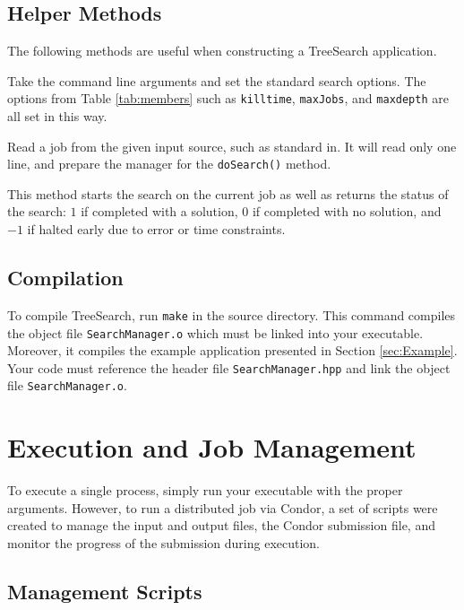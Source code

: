 \documentclass[11pt]{article}
\def\TreeSearch{{TreeSearch}}
\begin{document}
	
\subsection{Helper Methods}

The following methods are useful when constructing a {\TreeSearch} application.

	Take the command line arguments and set the standard search options.
	The options from Table \ref{tab:members} such as \texttt{killtime},
		\texttt{maxJobs}, and \texttt{maxdepth} are all set
		in this way.

	Read a job from the given input source, such as standard in.
	It will read only one line,
		and prepare the manager for the \texttt{doSearch()} method.
	
	This method starts the search on the current job
		as well as returns the status of the search:
		$1$ if completed with a solution,
		$0$ if completed with no solution,
		and $-1$ if halted early due to error or time constraints.
	

\subsection{Compilation}
\label{sec:Compilation}

To compile \TreeSearch, run \texttt{make} in the source directory.
This command compiles the object file \texttt{SearchManager.o} which must be
	linked into your executable.
Moreover, it compiles the example application presented in Section \ref{sec:Example}.
Your code must reference the header file \texttt{SearchManager.hpp}
	and link the object file \texttt{SearchManager.o}.

\section{Execution and Job Management}
\label{sec:Execution}

To execute a single process, simply run your executable with the proper arguments.
However, to run a distributed job via Condor, a set of scripts were created to manage
	the input and output files, the Condor submission file, and monitor the progress
	of the submission during execution.

\subsection{Management Scripts}
\end{document}
